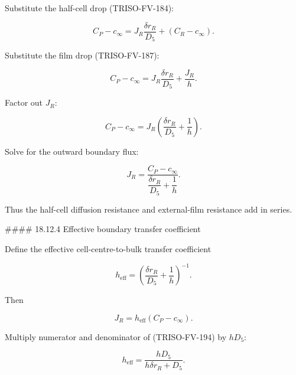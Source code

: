 \documentclass[11pt,a4paper]{article}
\begin{document}
Substitute the half-cell drop (TRISO-FV-184):

\begin{equation}
C_P-c_\infty
=
J_R\frac{\delta r_R}{D_5}
+
(C_R-c_\infty).
\tag{TRISO-FV-190}
\label{eq:triso-fv-190}
\end{equation}

Substitute the film drop (TRISO-FV-187):

\begin{equation}
C_P-c_\infty
=
J_R\frac{\delta r_R}{D_5}
+
\frac{J_R}{h}.
\tag{TRISO-FV-191}
\label{eq:triso-fv-191}
\end{equation}

Factor out $J_R$:

\begin{equation}
C_P-c_\infty
=
J_R
\left(
\frac{\delta r_R}{D_5}
+
\frac1h
\right).
\tag{TRISO-FV-192}
\label{eq:triso-fv-192}
\end{equation}

Solve for the outward boundary flux:

\begin{equation}
\boxed{
J_R
=
\frac{
C_P-c_\infty
}{
\dfrac{\delta r_R}{D_5}
+
\dfrac1h
}.
}
\tag{TRISO-FV-193}
\label{eq:triso-fv-193}
\end{equation}

Thus the half-cell diffusion resistance and external-film resistance add in series.

\#\#\#\# 18.12.4 Effective boundary transfer coefficient

Define the effective cell-centre-to-bulk transfer coefficient

\begin{equation}
\boxed{
h_{\mathrm{eff}}
=
\left(
\frac{\delta r_R}{D_5}
+
\frac1h
\right)^{-1}.
}
\tag{TRISO-FV-194}
\label{eq:triso-fv-194}
\end{equation}

Then

\begin{equation}
\boxed{
J_R
=
h_{\mathrm{eff}}
(C_P-c_\infty).
}
\tag{TRISO-FV-195}
\label{eq:triso-fv-195}
\end{equation}

Multiply numerator and denominator of (TRISO-FV-194) by $hD_5$:

\begin{equation}
h_{\mathrm{eff}}
=
\frac{hD_5}{
h\delta r_R+D_5
}.
\tag{TRISO-FV-196}
\label{eq:triso-fv-196}
\end{equation}
\end{document}
